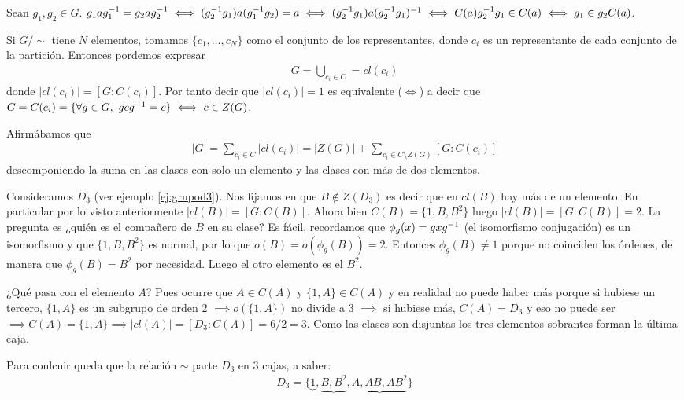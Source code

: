 Sean $g_1, g_2 \in G$. $g_1ag_1^{-1} = g_2ag_2^{-1} \iff (g_2^{-1}g_1)a(g_1^{-1}g_2) = a \iff (g_2^{-1}g_1)a(g_2^{-1}g_1)^{-1} \iff C(a) g_2^{-1}g_1 \in C(a) \iff g_1 \in g_2C(a)$.

Si $G/\sim$ tiene $N$ elementos, tomamos $\{c_1, \dots, c_N\}$ como el conjunto de los representantes, donde $c_i$ es un representante de cada conjunto de la partición. Entonces pordemos expresar
\begin{align*}
G = \bigcup_{c_i \in C} = cl(c_i)
\end{align*}
donde $|cl(c_i)| = [G:C(c_i)]$. Por tanto decir que $|cl(c_i)| = 1$ es equivalente ($\iff$) a decir que $G = C(c_i) = \{\forall g \in G,\ gc\inv{g} = c\} \iff c \in Z(G)$.

Afirmábamos que
\begin{align*}
|G| = \sum_{c_i \in C} |cl(c_i)| = |Z(G)| + \sum_{c_i \in C\setminus Z(G)} [G:C(c_i)]
\end{align*}
descomponiendo la suma en las clases con solo un elemento y las clases con más de dos elementos.

\hr

\begin{ej}
	Consideramos $D_3$ (ver ejemplo \ref{ej:grupod3}). Nos fijamos en que $B \not\in Z(D_3)$ es decir que en $cl(B)$ hay más de un elemento. En particular por lo visto anteriormente $|cl(B)| = [G:C(B)]$. Ahora bien $C(B) = \{1, B, B^2\}$ luego $|cl(B)| = [G:C(B)] = 2$. La pregunta es ¿quién es el compañero de $B$ en su clase? Es fácil, recordamos que $\phi_g (x) = gxg^{-1}$ (el isomorfismo conjugación) es un isomorfismo y que $\{1, B, B^2\}$ es normal, por lo que $o(B) = o(\phi_g(B)) = 2$. Entonces $\phi_g(B) \neq 1$ porque no coinciden los órdenes, de manera que $\phi_g(B) = B^2$ por necesidad. Luego el otro elemento es el $B^2$.
	
	¿Qué pasa con el elemento $A$? Pues ocurre que $A \in C(A)$ y $\{1, A\} \in C(A)$ y en realidad no puede haber más porque si hubiese un tercero, $\{1, A\}$ es un subgrupo de orden 2 $\implies o(\{1, A\})$ no divide a 3 $\implies$ si hubiese más, $C(A) = D_3$ y eso no puede ser $\implies C(A) = \{1, A\} \implies |cl(A)| = [D_3:C(A)] = 6/2 = 3$. Como las clases son disjuntas los tres elementos sobrantes forman la última caja.   
	
	Para conlcuir queda que la relación $\sim$ parte $D_3$ en 3 cajas, a saber:
	\begin{align*}
	D_3 = \{\underbrace{1}, \underbrace{B, B^2}, \underbrace{A, AB, AB^2}\}
	\end{align*}
\end{ej}


